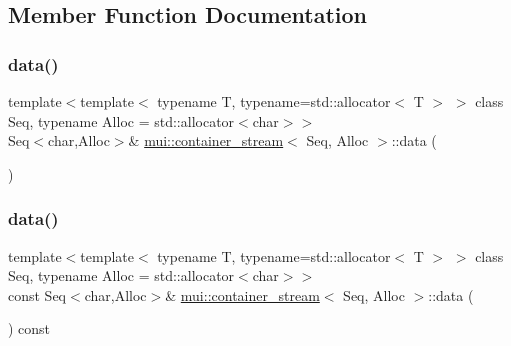 \subsection{Member Function Documentation}
\mbox{\label{classmui_1_1container__stream_a8c71e91aa411bba0cae4b8837961a621}} 
\subsubsection{\texorpdfstring{data()}{data()}\hspace{0.1cm}{\footnotesize\ttfamily [1/2]}}
{\footnotesize\ttfamily template$<$template$<$ typename T, typename=std\+::allocator$<$ T $>$ $>$ class Seq, typename Alloc  = std\+::allocator$<$char$>$$>$ \\
Seq$<$char,Alloc$>$\& \hyperlink{classmui_1_1container__stream}{mui\+::container\+\_\+stream}$<$ Seq, Alloc $>$\+::data (\begin{DoxyParamCaption}{ }\end{DoxyParamCaption})\hspace{0.3cm}{\ttfamily [inline]}}

\mbox{\label{classmui_1_1container__stream_a205a767916f764fc96055c87186c1229}} 
\subsubsection{\texorpdfstring{data()}{data()}\hspace{0.1cm}{\footnotesize\ttfamily [2/2]}}
{\footnotesize\ttfamily template$<$template$<$ typename T, typename=std\+::allocator$<$ T $>$ $>$ class Seq, typename Alloc  = std\+::allocator$<$char$>$$>$ \\
const Seq$<$char,Alloc$>$\& \hyperlink{classmui_1_1container__stream}{mui\+::container\+\_\+stream}$<$ Seq, Alloc $>$\+::data (\begin{DoxyParamCaption}{ }\end{DoxyParamCaption}) const\hspace{0.3cm}{\ttfamily [inline]}}

\mbox{\label{classmui_1_1container__stream_a6bcd220029a12f27de5443a2b48b245a}} 
